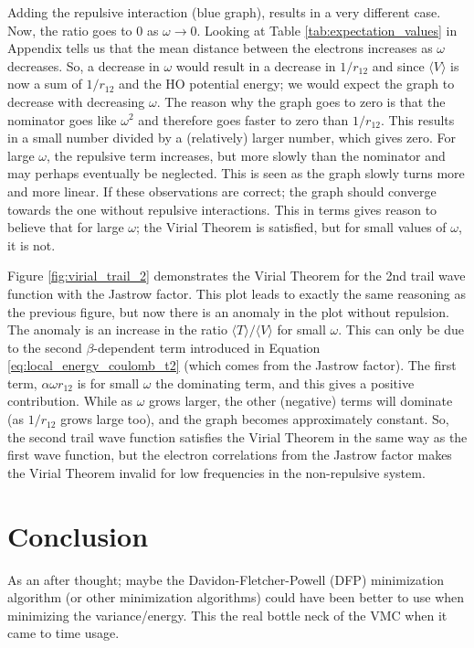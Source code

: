 \documentclass[12pt,english,a4paper]{article}
\begin{document}
Adding the repulsive interaction (blue graph), results in a very different case. Now, the ratio goes to $0$ as $\omega \rightarrow 0$. Looking at Table \ref{tab:expectation_values} in Appendix tells us that the mean distance between the electrons increases as $\omega$ decreases. So, a decrease in $\omega$ would result in a decrease in $1/r_{12}$ and since $\langle V\rangle$ is now a sum of $1/r_{12}$ and the HO potential energy; we would expect the graph to decrease with decreasing $\omega$. The reason why the graph goes to zero is that the nominator goes like $\omega^2$ and therefore goes faster to zero than $1/r_{12}$. This results in a small number divided by a (relatively) larger number, which gives zero. For large $\omega$, the repulsive term increases, but more slowly than the nominator and may perhaps eventually be neglected. This is seen as the graph slowly turns more and more linear. If these observations are correct; the graph should converge towards the one without repulsive interactions. This in terms gives reason to believe that for large $\omega$; the Virial Theorem is satisfied, but for small values of $\omega$, it is not.

Figure \ref{fig:virial_trail_2} demonstrates the Virial Theorem for the 2nd trail wave function with the Jastrow factor. This plot leads to exactly the same reasoning as the previous figure, but now there is an anomaly in the plot without repulsion. The anomaly is an increase in the ratio $\langle T\rangle /\langle V\rangle$ for small $\omega$. This can only be due to the second $\beta$-dependent term introduced in Equation \eqref{eq:local_energy_coulomb_t2} (which comes from the Jastrow factor). The first term, $\alpha\omega r_{12}$ is for small $\omega$ the dominating term, and this gives a positive contribution. While as $\omega$ grows larger, the other (negative) terms will dominate (as $1/r_{12}$ grows large too), and the graph becomes approximately constant. So, the second trail wave function satisfies the Virial Theorem in the same way as the first wave function, but the electron correlations from the Jastrow factor makes the Virial Theorem invalid for low frequencies in the non-repulsive system. 

\section{Conclusion} \label{section:conclusion}


As an after thought; maybe the Davidon-Fletcher-Powell (DFP) minimization algorithm (or other minimization algorithms) could have been better to use when minimizing the variance/energy. This the real bottle neck of the VMC when it came to time usage.
\end{document}
